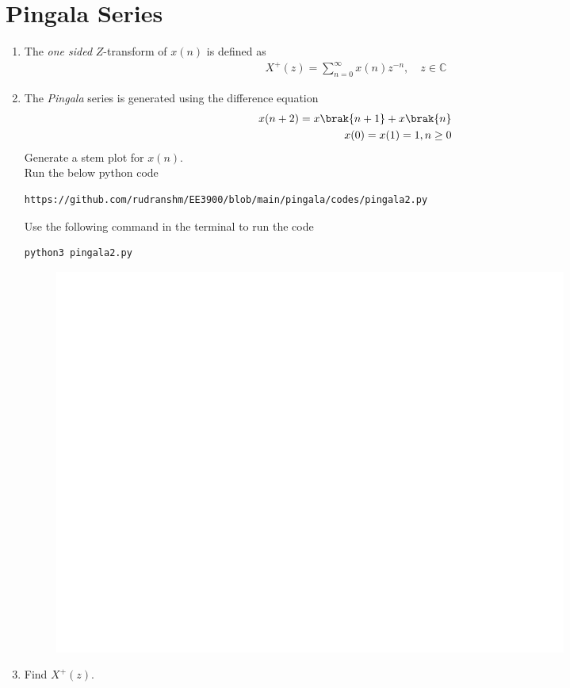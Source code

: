 \documentclass[journal,12pt,twocolumn]{IEEEtran}
\renewcommand\thesection{\arabic{section}}
\begin{document}
\section{Pingala Series}
\begin{enumerate}[label=\thesection.\arabic*,ref=\thesection.\theenumi]
\item The {\em one sided} $Z$-transform of $x(n)$ is defined as 
\begin{align}
	X^{+}(z) = \sum_{n = 0}^{\infty}x(n)z^{-n}, \quad z \in \mathbb{C}
\label{eq:one-Z}
\end{align}
	\item The {\em Pingala} series is generated using the difference equation 
\begin{align*}
	x(n+2) = x\brak{n+1} + x\brak{n}\\
	 x(0) = x(1) = 1, n \ge 0
	\label{eq:10-pingala}
\end{align*}
Generate a stem plot for $x(n)$.\\
\solution
Run the below python code 
\begin{lstlisting}
https://github.com/rudranshm/EE3900/blob/main/pingala/codes/pingala2.py
\end{lstlisting}
Use the following command in the terminal to run the code
\begin{lstlisting}
python3 pingala2.py
\end{lstlisting}
\begin{figure}
\centering
\includegraphics[width=\columnwidth]{2(2)}
\caption{}
\end{figure}
\item Find $X^{+}(z)$.\\

\end{enumerate}
\end{document}

